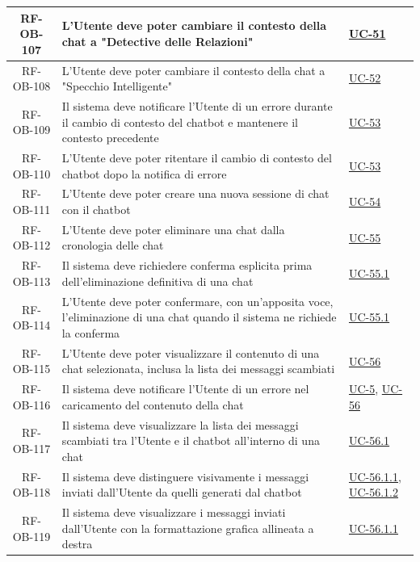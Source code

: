 \documentclass[a4paper,12pt]{article}
\begin{document}
\begin{center}
\begin{longtable}{|c|p{8.5cm}|>{\centering\arraybackslash}p{4cm}|}
\hline
\rowcolor{white}
RF-OB-107 & L'Utente deve poter cambiare il contesto della chat a "Detective delle Relazioni" & \hyperref[sec:UC-51]{UC-51} \\
\hline
\rowcolor{gray!20}
RF-OB-108 & L'Utente deve poter cambiare il contesto della chat a "Specchio Intelligente" & \hyperref[sec:UC-52]{UC-52} \\
\hline
\rowcolor{white}
RF-OB-109 & Il sistema deve notificare l'Utente di un errore durante il cambio di contesto del chatbot e mantenere il contesto precedente & \hyperref[sec:UC-53]{UC-53} \\
\hline
\rowcolor{gray!20}
RF-OB-110 & L'Utente deve poter ritentare il cambio di contesto del chatbot dopo la notifica di errore & \hyperref[sec:UC-53]{UC-53} \\
\hline
\rowcolor{white}
RF-OB-111 & L'Utente deve poter creare una nuova sessione di chat con il chatbot & \hyperref[subsec:UC-54]{UC-54} \\
\hline
\rowcolor{gray!20}
RF-OB-112 & L'Utente deve poter eliminare una chat dalla cronologia delle chat & \hyperref[subsec:UC-55]{UC-55} \\
\hline
\rowcolor{white}
RF-OB-113 & Il sistema deve richiedere conferma esplicita prima dell'eliminazione definitiva di una chat & \hyperref[subsec:UC-55.1]{UC-55.1} \\
\hline
\rowcolor{gray!20}
RF-OB-114 & L'Utente deve poter confermare, con un'apposita voce, l'eliminazione di una chat quando il sistema ne richiede la conferma & \hyperref[subsec:UC-55.1]{UC-55.1} \\
\hline
\rowcolor{white}
RF-OB-115 & L'Utente deve poter visualizzare il contenuto di una chat selezionata, inclusa la lista dei messaggi scambiati & \hyperref[subsec:UC-56]{UC-56} \\
\hline
\rowcolor{gray!20}
RF-OB-116 & Il sistema deve notificare l'Utente di un errore nel caricamento del contenuto della chat & \hyperref[sec:UC-5]{UC-5}, \hyperref[subsec:UC-56]{UC-56} \\
\hline
\rowcolor{white}
RF-OB-117 & Il sistema deve visualizzare la lista dei messaggi scambiati tra l'Utente e il chatbot all'interno di una chat & \hyperref[subsec:UC-56.1]{UC-56.1} \\
\hline
\rowcolor{gray!20}
RF-OB-118 & Il sistema deve distinguere visivamente i messaggi inviati dall'Utente da quelli generati dal chatbot & \hyperref[subsec:UC-56.1.1]{UC-56.1.1}, \hyperref[subsec:UC-56.1.2]{UC-56.1.2} \\
\hline
\rowcolor{white}
RF-OB-119 & Il sistema deve visualizzare i messaggi inviati dall'Utente con la formattazione grafica allineata a destra & \hyperref[subsec:UC-56.1.1]{UC-56.1.1} \\

\end{longtable}
\end{center}
\end{document}
